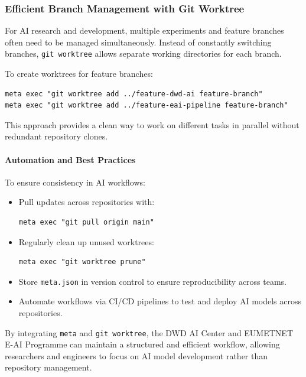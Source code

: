 %
\subsubsection{Efficient Branch Management with Git Worktree}
For AI research and development, multiple experiments and feature branches often need to be managed simultaneously. Instead of constantly switching branches, \texttt{git worktree} allows separate working directories for each branch.

To create worktrees for feature branches:
\begin{verbatim}
meta exec "git worktree add ../feature-dwd-ai feature-branch"
meta exec "git worktree add ../feature-eai-pipeline feature-branch"
\end{verbatim}

This approach provides a clean way to work on different tasks in parallel without redundant repository clones.

\paragraph{Automation and Best Practices}
To ensure consistency in AI workflows:
\begin{itemize}[itemsep=1pt,topsep=3pt]
    \item Pull updates across repositories with:
    \begin{verbatim}meta exec "git pull origin main"\end{verbatim}
    \item Regularly clean up unused worktrees:
    \begin{verbatim}meta exec "git worktree prune"\end{verbatim}
    \item Store \texttt{meta.json} in version control to ensure reproducibility across teams.
    \item Automate workflows via CI/CD pipelines to test and deploy AI models across repositories.
\end{itemize}

By integrating \lstinline|meta| and \lstinline|git worktree|, the DWD AI Center and EUMETNET E-AI Programme can maintain a structured and efficient workflow, allowing researchers and engineers to focus on AI model development rather than repository management.


%
